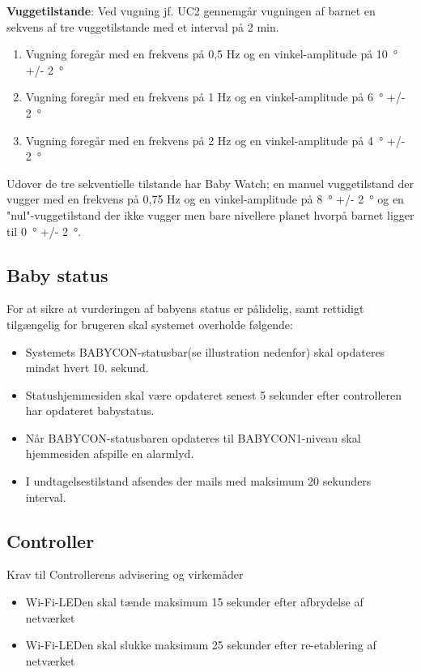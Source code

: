 \textbf{Vuggetilstande}: \label{kravspec:ikke_funk_vuggetilstande}
Ved vugning jf. UC2 gennemgår vugningen af barnet en sekvens af tre vuggetilstande med et interval på 2 min.
\begin{enumerate}

\item Vugning foregår med en frekvens på 0,5 Hz og en vinkel-amplitude på \SI{10}{\degree} +/- \SI{2}{\degree}
\item Vugning foregår med en frekvens på 1 Hz og en vinkel-amplitude på \SI{6}{\degree} +/- \SI{2}{\degree}
\item Vugning foregår med en frekvens på 2 Hz og en vinkel-amplitude på \SI{4}{\degree} +/- \SI{2}{\degree}
\end{enumerate}

Udover de tre sekventielle tilstande har Baby Watch; en manuel vuggetilstand der vugger med en frekvens på 0,75 Hz og en vinkel-amplitude på \SI{8}{\degree} +/- \SI{2}{\degree} og en "nul"-vuggetilstand der ikke vugger men bare nivellere planet hvorpå barnet ligger til \SI{0}{\degree} +/- \SI{2}{\degree}.

\subsection*{Baby status}
For at sikre at vurderingen af babyens status er pålidelig, samt rettidigt tilgængelig for brugeren skal systemet overholde følgende:
\begin{itemize}
\item Systemets BABYCON-statusbar(se illustration nedenfor) skal opdateres mindst hvert 10. sekund.
\item Statushjemmesiden skal være opdateret senest 5 sekunder efter controlleren har opdateret babystatus.
\item Når BABYCON-statusbaren opdateres til BABYCON1-niveau skal hjemmesiden afspille en alarmlyd.
\item I undtagelsestilstand afsendes der mails med maksimum 20 sekunders interval. 
\end{itemize}

\subsection*{Controller}
Krav til Controllerens advisering og virkemåder
\begin{itemize}
\item Wi-Fi-LEDen skal tænde maksimum 15 sekunder efter afbrydelse af netværket
\item Wi-Fi-LEDen skal slukke maksimum 25 sekunder efter re-etablering af netværket
\end{itemize}